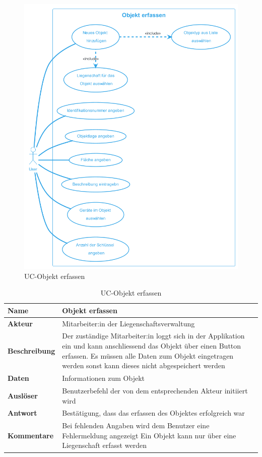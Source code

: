 \begin{figure}[H]
  \begin{center}
    \includegraphics[width=0.8\linewidth]{content/diagrams/out/usecase/objektErfassen/ObjektErfassen.png}
    \caption{UC-Objekt erfassen}
    \label{objekt}
  \end{center}
\end{figure}

\vspace*{-1cm}

\begin{table}[H]
  \centering
  \settowidth{}
  \setlength\extrarowheight{2pt}
  \begin{tabulary}{1.0\textwidth}{|a|m{14cm}|}
    \hline
    \textbf{Name}& Objekt erfassen\\
    \hline
    \textbf{Akteur}& Mitarbeiter:in der Liegenschaftsverwaltung\\
    \hline 
    \textbf{Beschreibung} & Der zuständige Mitarbeiter:in loggt sich in der Applikation ein und kann anschliessend das Objekt über einen Button erfassen. Es müssen alle Daten zum Objekt eingetragen werden sonst kann dieses nicht abgespeichert werden\\
    \hline
    \textbf{Daten} & Informationen zum Objekt\\
    \hline
    \textbf{Auslöser} & Benutzerbefehl der von dem entsprechenden Akteur initiiert wird\\
    \hline
    \textbf{Antwort} & Bestätigung, dass das erfassen des Objektes erfolgreich war\\
    \hline
    \textbf{Kommentare} & Bei fehlenden Angaben wird dem Benutzer eine Fehlermeldung angezeigt\newline 
    Ein Objekt kann nur über eine Liegenschaft erfasst werden\\
    \hline
  \end{tabulary}
  \caption{UC-Objekt erfassen}
\end{table}

